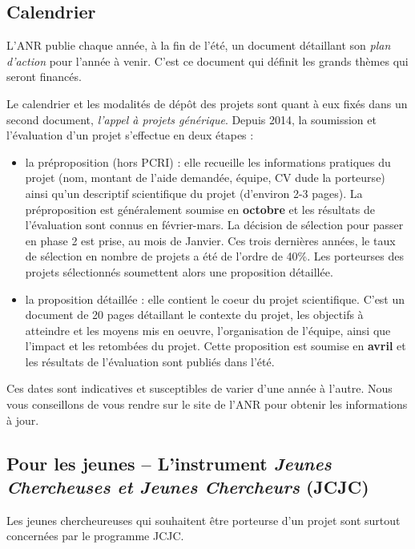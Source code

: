 \subsection{Calendrier}

L'ANR publie chaque ann\'ee, \`a la fin de l'\'et\'e, un document d\'etaillant son {\em plan d'action} pour l'ann\'ee \`a venir. C'est ce document qui d\'efinit les grands th\`emes qui seront financ\'es.

Le calendrier et les modalit\'es de d\'ep\^ot des projets sont quant \`a eux fix\'es dans un second document, {\em l'appel \`a projets g\'en\'erique}. Depuis 2014, la soumission et l'\'evaluation d'un projet s'effectue en deux \'etapes :
\begin{itemize}
\item la pr\'eproposition (hors PCRI) : elle recueille les informations pratiques du projet (nom, montant de l'aide demand\'ee, \'equipe, CV du\mp de la porteur\mp se) ainsi qu'un descriptif scientifique du projet (d'environ 2-3 pages). La pr\'eproposition est g\'en\'eralement soumise en {\bf octobre} et les r\'esultats de l'\'evaluation sont connus en f\'evrier-mars. La d\'ecision de s\'election pour passer en phase 2 est prise, au mois de Janvier. Ces trois derni\`eres ann\'ees, le taux de s\'election en nombre de projets a \'et\'e de l'ordre de 40\%. Les porteur\mp ses des projets s\'electionn\'es soumettent alors une proposition d\'etaill\'ee. 
\item la proposition d\'etaill\'ee : elle contient le coeur du projet scientifique. C'est un document de 20 pages d\'etaillant le contexte du projet, les objectifs \`a atteindre et les moyens mis en oeuvre, l'organisation de l'\'equipe, ainsi que l'impact et les retomb\'ees du projet. Cette proposition est soumise en {\bf avril} et les r\'esultats de l'\'evaluation sont publi\'es dans l'\'et\'e.
\end{itemize}

Ces dates sont indicatives et susceptibles de varier d'une ann\'ee \`a l'autre. Nous vous conseillons de vous rendre sur le site de l'ANR pour obtenir les informations \`a jour.

\subsection{Pour les jeunes -- L'instrument {\em Jeunes Chercheuses et Jeunes Chercheurs} (JCJC)}

Les jeunes chercheur\mp euse\mp s qui souhaitent \^etre porteur\mp se d'un projet sont surtout concern\'e\mp e\mp s par le programme JCJC.


